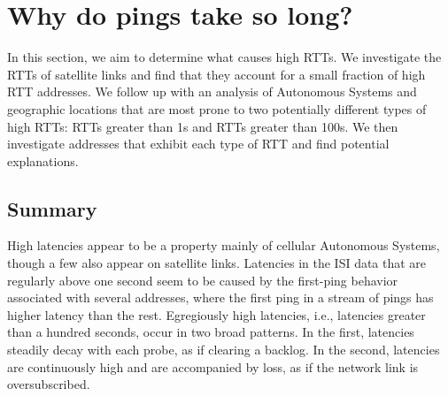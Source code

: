 
\section{Why do pings take so long?}
\label{sec:causes}

In this section, we aim to determine what causes high RTTs. We
investigate the RTTs of satellite
links and find that they account for a small fraction of high RTT
addresses. We follow up with an analysis of Autonomous Systems and
geographic locations that are most prone to two potentially different
types of high RTTs: RTTs greater than 1s and RTTs greater than
100s. We then investigate addresses that exhibit each type of RTT and
find potential explanations.





\subsection{Summary}
High latencies appear to be a property mainly of cellular
  Autonomous Systems, though a few also appear on satellite
  links. Latencies in the ISI data that are regularly above one second seem to be caused
by the first-ping behavior associated with several addresses, where
the first ping in a stream of pings has higher latency than the
rest. Egregiously high latencies, i.e., latencies greater than a
hundred seconds, occur in two broad patterns. In the first, latencies
steadily decay with each probe, as if clearing a backlog. In the second, latencies are continuously
high and are accompanied by loss, as if the network link is oversubscribed.
